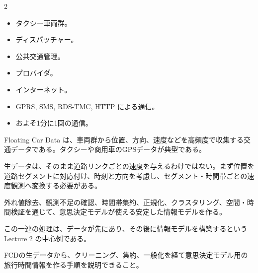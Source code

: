 \begin{multicols}{2}

\footnotesize

\raggedcolumns


\begin{itemize}
\item タクシー車両群。
\item ディスパッチャー。
\item 公共交通管理。
\item プロバイダ。
\item インターネット。
\item GPRS, SMS, RDS-TMC, HTTP による通信。
\item およそ1分に1回の通信。
\end{itemize}

Floating Car Data は、車両群から位置、方向、速度などを高頻度で収集する交通データである。タクシーや商用車のGPSデータが典型である。\par

生データは、そのまま道路リンクごとの速度を与えるわけではない。まず位置を道路セグメントに対応付け、時刻と方向を考慮し、セグメント・時間帯ごとの速度観測へ変換する必要がある。\par

外れ値除去、観測不足の確認、時間帯集約、正規化、クラスタリング、空間・時間検証を通じて、意思決定モデルが使える安定した情報モデルを作る。\par

この一連の処理は、データが先にあり、その後に情報モデルを構築するという Lecture 2 の中心例である。\par

FCDの生データから、クリーニング、集約、一般化を経て意思決定モデル用の旅行時間情報を作る手順を説明できること。\par



\end{multicols}

